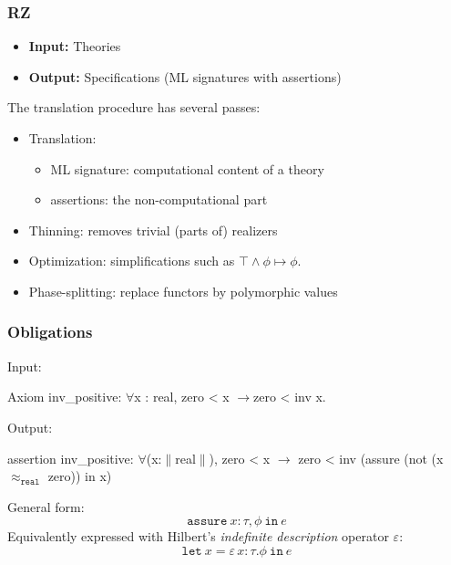 \documentclass[compress,t]{beamer}
\newcommand{\iTo}{{\ensuremath{\to}}}
\newcommand{\iForall}{$\forall$}
\newcommand{\iT}[1]{$\|$#1$\|$}
\newcommand{\iPer}[1]{$\approx_{\mathtt{#1}}$}
\begin{document}
\begin{frame}
  \frametitle{RZ}

  \begin{itemize}
  \item \textbf{Input:} Theories
  \item \textbf{Output:} Specifications (ML signatures with assertions)    
  \end{itemize}

  \pause

  The translation procedure has several passes:
  \begin{itemize}
  \item Translation:
    \begin{itemize}
    \item ML signature: computational content of a theory
    \item assertions: the non-computational part
    \end{itemize}
  \item Thinning: removes trivial (parts of) realizers
  \item Optimization: simplifications such as $\top \land \phi \mapsto
    \phi$.
  \item Phase-splitting: replace functors by polymorphic values
  \end{itemize}
\end{frame}


\begin{frame}[fragile]
  \frametitle{Obligations}

Input:
%
\begin{source}
Axiom inv_positive:
  \iForall x : real, zero < x \iTo zero < inv x.
\end{source}

Output:
%
\begin{source}
assertion inv_positive:
   \iForall (x:\iT{real}), zero < x \iTo
   zero < inv (assure (not (x \iPer{real} zero)) in x)
\end{source}

\pause

General form:
%
\begin{equation*}
  \mathtt{assure}\ x : \tau, \phi\ \mathtt{in}\ e
\end{equation*}
%
Equivalently expressed with Hilbert's \emph{indefinite description}
operator $\varepsilon$:
%
\begin{equation*}
  \mathtt{let}\ x = \varepsilon\, x : \tau. \phi\ \mathtt{in}\ e
\end{equation*}

\end{frame}
\end{document}
